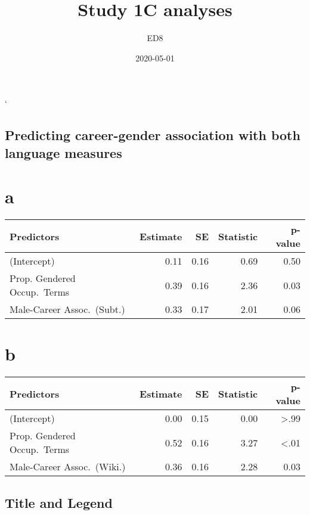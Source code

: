 \documentclass[]{article}
\title{Study 1C analyses}
\subtitle{ED8}
\author{}
\date{2020-05-01}
\begin{document}
\maketitle

`

\hypertarget{predicting-career-gender-association-with-both-language-measures}{%
\subsection{Predicting career-gender association with both language
measures}\label{predicting-career-gender-association-with-both-language-measures}}

\section*{a}
\begin{tabular}{lrrrr}

Predictors & Estimate & SE & Statistic & p-value\\
\midrule

(Intercept) & 0.11 & 0.16 & 0.69 & 0.50\\
Prop. Gendered Occup.\ Terms & 0.39 & 0.16 & 2.36 &
0.03\\
 Male-Career Assoc.\ (Subt.) & 0.33 & 0.17 & 2.01 &
0.06\\
\bottomrule
\end{tabular}



\section*{b}
\begin{tabular}{lrrrr}

Predictors & Estimate & SE & Statistic & p-value\\
\midrule

(Intercept) & 0.00 & 0.15 & 0.00 & >.99\\
Prop. Gendered Occup.\ Terms & 0.52 & 0.16 & 3.27&
<.01\\
Male-Career Assoc.\ (Wiki.) & 0.36 & 0.16 & 2.28 &
0.03\\
\bottomrule
\end{tabular}

\pagebreak

\hypertarget{title-and-legend}{%
\subsection{Title and Legend}\label{title-and-legend}}
\end{document}
